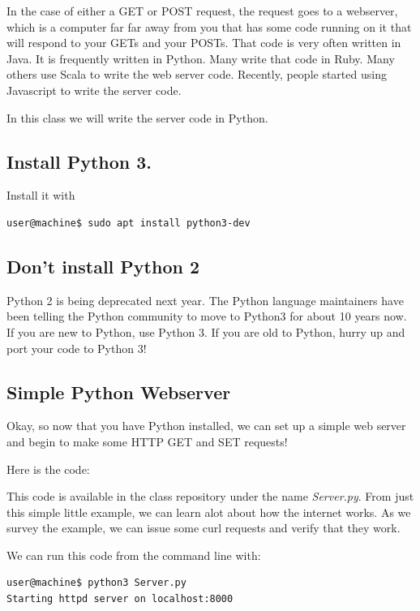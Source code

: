\documentclass[10pt]{article}
\begin{document}
In the case of either a GET or POST request, the request goes to a webserver, which is a computer far far away from you that has some code running on it that will respond to your GETs and your POSTs. That code is very often written in Java. It is frequently written in Python. Many write that code in Ruby. Many others use Scala to write the web server code. Recently, people started using Javascript to write the server code. 

In this class we will write the server code in Python.

\subsection{Install Python 3.}

Install it with 

\begin{lstlisting}
user@machine$ sudo apt install python3-dev
\end{lstlisting}

\subsection{Don't install Python 2}
Python 2 is being deprecated next year. The Python language maintainers have been telling the Python community to move to Python3 for about 10 years now. If you are new to Python, use Python 3. If you are old to Python, hurry up and port your code to Python 3!

\subsection{Simple Python Webserver}
Okay, so now that you have Python installed, we can set up a simple web server and begin to make some HTTP GET and SET requests!

Here is the code:


This code is available in the class repository under the name \textit{Server.py}. From just this simple little example, we can learn alot about how the internet works. As we survey the example, we can issue some curl requests and verify that they work.

We can run this code from the command line with:

\begin{lstlisting}
user@machine$ python3 Server.py
Starting httpd server on localhost:8000
\end{lstlisting}
\end{document}

